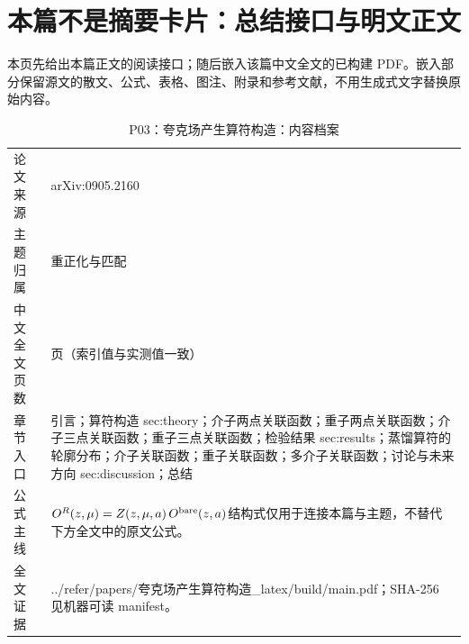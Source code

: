 \documentclass[UTF8,11pt,oneside]{ctexbook}
\begin{document}
\section*{本篇不是摘要卡片：总结接口与明文正文}
本页先给出本篇正文的阅读接口；随后嵌入该篇中文全文的已构建 PDF。嵌入部分保留源文的散文、公式、表格、图注、附录和参考文献，不用生成式文字替换原始内容。
\begin{table}[htbp]
  \centering
  \caption{P03：夸克场产生算符构造：内容档案}
  \small
  \begin{tabularx}{0.96\textwidth}{@{}p{3.3cm}>{\raggedright\arraybackslash}X@{}}
    \toprule
    论文来源 & arXiv:0905.2160 \\
    主题归属 & 重正化与匹配 \\
    中文全文页数 & 14 页（索引值与实测值一致） \\
    章节入口 & 引言；算符构造 sec:theory；介子两点关联函数；重子两点关联函数；介子三点关联函数；重子三点关联函数；检验结果 sec:results；蒸馏算符的轮廓分布；介子关联函数；重子关联函数；多介子关联函数；讨论与未来方向 sec:discussion；总结 \\
    公式主线 & $O^{R}(z,\mu)=Z(z,\mu,a)\,O^{\rm bare}(z,a)$\newline\scriptsize 结构式仅用于连接本篇与主题，不替代下方全文中的原文公式。 \\
    全文证据 & ../\allowbreak{}refer/\allowbreak{}papers/\allowbreak{}夸克场产生算符构造\_\allowbreak{}latex/\allowbreak{}build/\allowbreak{}main.pdf；SHA-256 见机器可读 manifest。 \\
    \bottomrule
  \end{tabularx}
\end{table}
\end{document}

